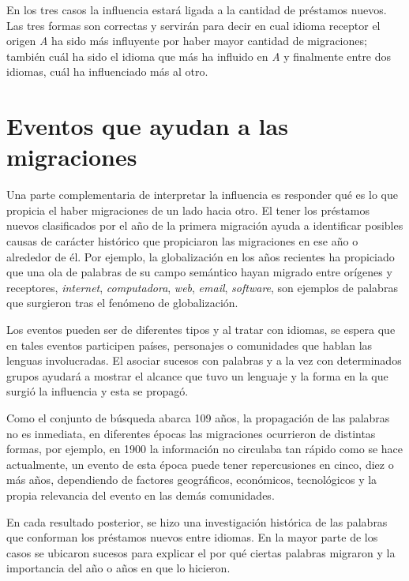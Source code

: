 En los tres casos la influencia estará ligada a la cantidad de préstamos
nuevos.  Las tres formas son correctas y servirán para decir en cual idioma
receptor  el origen \textit{A} ha sido más influyente por haber mayor cantidad
de migraciones; también cuál ha sido el idioma  que más ha influido en
\textit{A} y finalmente entre dos idiomas,  cuál ha influenciado más al otro. 
\section{Eventos que ayudan a las migraciones} %

Una parte complementaria de interpretar la influencia es responder qué es lo
que propicia el haber migraciones de un lado hacia otro.  El tener los
préstamos nuevos clasificados por el año de la primera migración ayuda a
identificar posibles causas de carácter histórico que propiciaron las
migraciones en ese año o alrededor de él.  Por ejemplo, la globalización en los
años recientes ha propiciado que una ola de palabras de su campo semántico
hayan migrado entre orígenes y receptores,  \textit{internet},
\textit{computadora}, \textit{web}, \textit{email},  \textit{software}, son
ejemplos de palabras que surgieron tras el fenómeno de globalización. 

Los eventos pueden ser de diferentes tipos y al tratar con idiomas, se espera
que en tales eventos participen países, personajes o  comunidades que hablan
las lenguas involucradas.  El asociar sucesos con palabras y a la vez con
determinados grupos ayudará a mostrar el alcance que tuvo un lenguaje y la
forma en la que surgió la influencia y esta se propagó. 

Como el conjunto de búsqueda abarca 109 años,  la propagación de las palabras
no es inmediata, en diferentes épocas las migraciones ocurrieron de distintas
formas,  por ejemplo, en 1900 la información no circulaba tan rápido como se
hace actualmente, un evento de esta época puede tener repercusiones en cinco,
diez o más años,  dependiendo de factores geográficos, económicos, tecnológicos
y  la  propia relevancia del evento en las demás comunidades.

En cada resultado posterior, se hizo una investigación histórica de las
palabras que conforman los préstamos nuevos entre idiomas. En la mayor parte
de los casos se ubicaron sucesos para explicar el por qué ciertas palabras
migraron y la importancia del año o años en que lo hicieron. 

